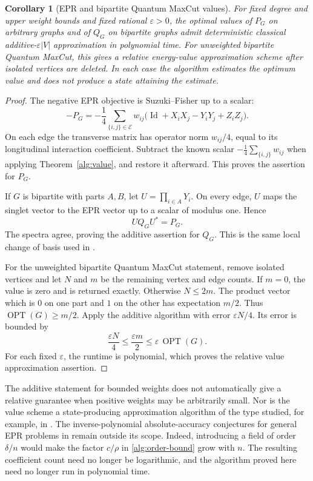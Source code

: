 \documentclass[reqno]{amsart}
\newtheorem{corollary}[theorem]{Corollary}
\theoremstyle{definition}
\theoremstyle{remark}
\DeclareMathOperator{\Id}{Id}
\begin{document}
\begin{corollary}[EPR and bipartite Quantum MaxCut values]
\label{alg:qmc}
For fixed degree and upper weight bounds and fixed rational
\(\varepsilon>0\), the optimal values of \(P_G\) on arbitrary
graphs and of \(Q_G\) on bipartite graphs admit deterministic
classical additive-\(\varepsilon |V|\) approximation in
polynomial time.
For unweighted bipartite Quantum MaxCut, this gives a relative
energy-value approximation scheme after isolated vertices are
deleted.  In each case the algorithm estimates the optimum
value and does not produce a state attaining the estimate.
\end{corollary}

\begin{proof}
The negative EPR objective is Suzuki--Fisher up to a scalar:
\begin{equation}
 -P_G
  =-\frac14\sum_{\{i,j\}\in\mathcal E}w_{ij}
       \bigl(\Id+X_iX_j-Y_iY_j+Z_iZ_j\bigr).
 \label{alg:epr-expansion}
\end{equation}
On each edge the transverse matrix has operator norm
\(w_{ij}/4\), equal to its longitudinal interaction
coefficient.  Subtract the known scalar
\(-\frac14\sum_{\{i,j\}}w_{ij}\) when applying
Theorem~\ref{alg:value}, and restore it afterward.
This proves the assertion for \(P_G\).

If \(G\) is bipartite with parts \(A,B\), let
\(U=\prod_{i\in A}Y_i\).
On every edge, \(U\) maps the singlet vector to the EPR vector
up to a scalar of modulus one.  Hence
\[
 UQ_GU^*=P_G.
 \]
The spectra agree, proving the additive assertion for
\(Q_G\).  This is the same local change of basis used in
\cite[Corollary~2]{BGLW26}.

For the unweighted bipartite Quantum MaxCut statement, remove isolated
vertices and let \(N\) and \(m\) be the remaining vertex and
edge counts.  If \(m=0\), the value is zero and is returned
exactly.  Otherwise \(N\le2m\).
The product vector which is \(0\) on
one part and \(1\) on the other has expectation \(m/2\).
Thus \(\operatorname{OPT}(G)\ge m/2\).
Apply the additive algorithm with error
\(\varepsilon N/4\).  Its error is bounded by
\[
 \frac{\varepsilon N}{4}
 \le\frac{\varepsilon m}{2}
 \le\varepsilon\,\operatorname{OPT}(G).
 \]
For each fixed \(\varepsilon\), the runtime is polynomial,
which proves the relative value approximation assertion.
\end{proof}

The additive statement for bounded weights does not automatically
give a relative guarantee when positive weights may be arbitrarily
small.  Nor is the value scheme a state-producing approximation
algorithm of the type studied, for example, in \cite{ALMPSS26}.
The inverse-polynomial absolute-accuracy conjectures for general
EPR problems in \cite{MarwahaSud26} remain outside its scope.
Indeed, introducing a field of order \(\delta/n\) would make
the factor \(c/\rho\) in \eqref{alg:order-bound} grow with \(n\).
The resulting coefficient count need no longer be logarithmic,
and the algorithm proved here need no longer run in polynomial
time.
\end{document}
